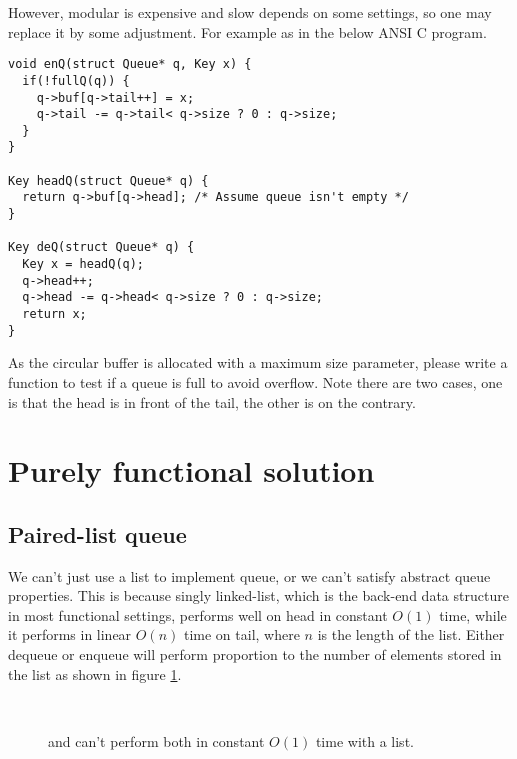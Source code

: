 \documentclass{article}
\begin{document}
However, modular is expensive and slow depends on some settings, so one
may replace it by some adjustment. For example as in the below ANSI C
program.

\begin{lstlisting}
void enQ(struct Queue* q, Key x) {
  if(!fullQ(q)) {
    q->buf[q->tail++] = x;
    q->tail -= q->tail< q->size ? 0 : q->size;
  }
}

Key headQ(struct Queue* q) {
  return q->buf[q->head]; /* Assume queue isn't empty */
}

Key deQ(struct Queue* q) {
  Key x = headQ(q);
  q->head++;
  q->head -= q->head< q->size ? 0 : q->size;
  return x;
}
\end{lstlisting}

\begin{Exercise}
As the circular buffer is allocated with a maximum size parameter, please
write a function to test if a queue is full to avoid overflow. Note
there are two cases, one is that the head is in front of the tail,
the other is on the contrary.
\end{Exercise}

\section{Purely functional solution}

\subsection{Paired-list queue}

We can't just use a list to implement queue, or we can't satisfy abstract
queue properties. This is because singly linked-list, which
is the back-end data structure in most functional settings, performs
well on head in constant $O(1)$ time, while it performs in linear $O(n)$
time on tail, where $n$ is the length of the list. Either dequeue or enqueue
will perform proportion to the number of elements stored in the list
as shown in figure \ref{fig:linked-list-queue}.

\begin{figure}[htbp]
  \centering
   \\
  \caption{ and  can't perform both in constant $O(1)$ time with a list.} \label{fig:linked-list-queue}
\end{figure}
\end{document}
